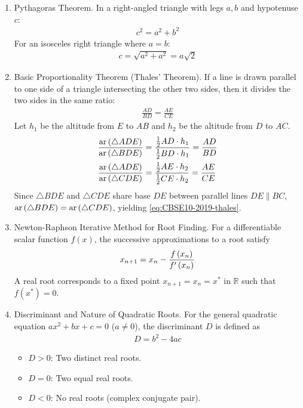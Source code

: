 \documentclass[12pt,a4paper]{article}
\begin{document}
\begin{enumerate}[label=\thesubsection.\arabic*, ref=\thesubsection.\theenumi]
	\item Pythagoras Theorem. In a right-angled triangle with legs $a, b$ and hypotenuse $c$:
	\begin{align}
		c^2 = a^2 + b^2 \label{eq:CBSE10-2019-pythagoras}
	\end{align}
	For an isosceles right triangle where $a = b$:
	\begin{align}
		c = \sqrt{a^2 + a^2} = a\sqrt{2} \label{eq:CBSE10-2019-isosceles_right}
	\end{align}
	
	\item Basic Proportionality Theorem (Thales' Theorem).
	If a line is drawn parallel to one side of a triangle intersecting the other two sides, then it divides the two sides in the same ratio:
	\begin{align}
		\frac{AD}{BD} = \frac{AE}{CE} \label{eq:CBSE10-2019-thales}
	\end{align}
	\solution
	Let $h_1$ be the altitude from $E$ to $AB$ and $h_2$ be the altitude from $D$ to $AC$.
	\begin{align}
		\frac{\text{ar}\left(\triangle ADE\right)}{\text{ar}\left(\triangle BDE\right)} &= \frac{\frac{1}{2}AD \cdot h_1}{\frac{1}{2}BD \cdot h_1} = \frac{AD}{BD} \\
		\frac{\text{ar}\left(\triangle ADE\right)}{\text{ar}\left(\triangle CDE\right)} &= \frac{\frac{1}{2}AE \cdot h_2}{\frac{1}{2}CE \cdot h_2} = \frac{AE}{CE}
	\end{align}
	Since $\triangle BDE$ and $\triangle CDE$ share base $DE$ between parallel lines $DE \parallel BC$, $\text{ar}\left(\triangle BDE\right) = \text{ar}\left(\triangle CDE\right)$, yielding \eqref{eq:CBSE10-2019-thales}.
	
	\item Newton-Raphson Iterative Method for Root Finding.
	For a differentiable scalar function $f(x)$, the successive approximations to a root satisfy
	\begin{align}
		x_{n+1} = x_n - \frac{f\left(x_n\right)}{f'\left(x_n\right)} \label{eq:CBSE10-2019-newton_raphson}
	\end{align}
	A real root corresponds to a fixed point $x_{n+1} = x_n = x^*$ in $\mathbb{R}$ such that $f(x^*) = 0$.
	
	\item Discriminant and Nature of Quadratic Roots.
	For the general quadratic equation $ax^2 + bx + c = 0$ ($a \neq 0$), the discriminant $D$ is defined as
	\begin{align}
		D = b^2 - 4ac \label{eq:CBSE10-2019-discriminant}
	\end{align}
	\begin{itemize}
		\item $D > 0$: Two distinct real roots.
		\item $D = 0$: Two equal real roots.
		\item $D < 0$: No real roots (complex conjugate pair).
	\end{itemize}
	

\end{enumerate}
\end{document}
